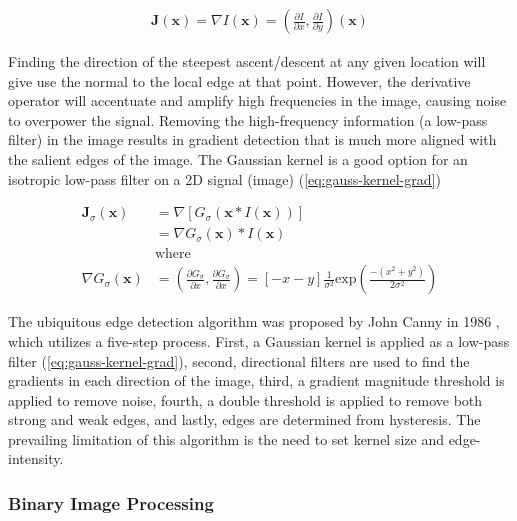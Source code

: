 \begin{equation}
    \begin{aligned}
        \mathbf{J}(\mathbf{x}) = \nabla I(\mathbf{x}) = (\frac{\partial I}{\partial x}, \frac{\partial I}{\partial y})(\mathbf{x})
    \end{aligned}
    \label{eq:img-grad}
\end{equation}

Finding the direction of the steepest ascent/descent at any given location will give use the normal to the local edge at that point. However, the derivative operator will accentuate and amplify high frequencies in the image, causing noise to overpower the signal. Removing the high-frequency information (a low-pass filter) in the image results in gradient detection that is much more aligned with the salient edges of the image. The Gaussian kernel is a good option for an isotropic low-pass filter on a 2D signal (image) (\cref{eq:gauss-kernel-grad})

\begin{equation}
    \begin{aligned}
        \mathbf{J}_{\sigma}(\mathbf{x}) &= \nabla [G_\sigma (\mathbf{x} * I(\mathbf{x}))] \\
        &= \nabla G_\sigma (\mathbf{x}) * I(\mathbf{x}) \\
        &\text{where} \\
        \nabla G_\sigma (\mathbf{x}) &= (\frac{\partial G_{\sigma}}{\partial x}, \frac{\partial G_{\sigma}}{\partial x}) = [-x - y]\frac{1}{\sigma^{2}}\text{exp}(\frac{-(x^2 + y^2)}{2 \sigma^2})
    \end{aligned}
    \label{eq:gauss-kernel-grad}
\end{equation}


The ubiquitous edge detection algorithm was proposed by John Canny in 1986 \cite{cannyComputationalApproachEdge1986}, which utilizes a five-step process. First, a Gaussian kernel is applied as a low-pass filter (\cref{eq:gauss-kernel-grad}), second, directional filters are used to find the gradients in each direction of the image, third, a gradient magnitude threshold is applied to remove noise, fourth, a double threshold is applied to remove both strong and weak edges, and lastly, edges are determined from hysteresis. The prevailing limitation of this algorithm is the need to set kernel size and edge-intensity.

\subsubsection{Binary Image Processing}
\label{sec:binary-img-proc}

